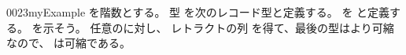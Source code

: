 \documentclass[index]{subfiles}
\begin{document}
\StartDefiningTabulars
\begin{myBlock}{0023}{myExample}
  を階数とする。
  型
  を次のレコード型と定義する。
  を
  と定義する。
  を示そう。
  任意のに対し、
  レトラクトの列
  を得て、最後の型はより可縮なので、
  は可縮である。
\end{myBlock}
\StopDefiningTabulars
\end{document}
